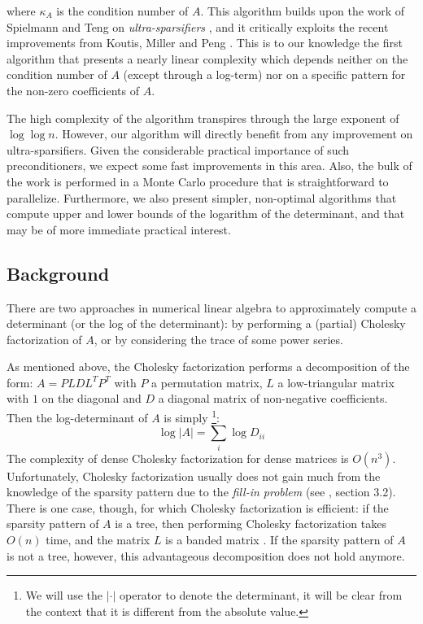 where $\kappa_{A}$ is the condition number of $A$. This algorithm
builds upon the work of Spielmann and Teng on \emph{ultra-sparsifiers}
\cite{Spielman2009a}, and it critically exploits the recent improvements
from Koutis, Miller and Peng \cite{Koutis2010}. This is to our knowledge
the first algorithm that presents a nearly linear complexity which
depends neither on the condition number of $A$ (except through a
log-term) nor on a specific pattern for the non-zero coefficients
of $A$.

The high complexity of the algorithm transpires through the large
exponent of $\log\log n$. However, our algorithm will directly benefit
from any improvement on ultra-sparsifiers. Given the considerable
practical importance of such preconditioners, we expect some fast
improvements in this area. Also, the bulk of the work is performed
in a Monte Carlo procedure that is straightforward to parallelize.
Furthermore, we also present simpler, non-optimal algorithms that
compute upper and lower bounds of the logarithm of the determinant,
and that may be of more immediate practical interest.

\subsection{Background} 
There are two approaches in numerical linear algebra
to approximately compute a determinant (or the log of the determinant):
by performing a (partial) Cholesky factorization of $A$, or by considering
the trace of some power series.

As mentioned above, the Cholesky factorization performs a decomposition
of the form: $A=PLDL^{T}P^{T}$ with $P$ a permutation matrix, $L$
a low-triangular matrix with $1$ on the diagonal and $D$ a diagonal
matrix of non-negative coefficients. Then the log-determinant of $A$
is simply%
\footnote{We will use the $\left|\cdot\right|$ operator to denote the determinant,
it will be clear from the context that it is different from the absolute
value.%
}: 
\[
\log\left|A\right|=\sum_{i}\log D_{ii}
\]
The complexity of dense Cholesky factorization for dense matrices
is $O\left(n^{3}\right)$. Unfortunately, Cholesky factorization usually
does not gain much from the knowledge of the sparsity pattern due
to the \emph{fill-in problem} (see \cite{meurant1999computer}, section
3.2). There is one case, though, for which Cholesky factorization
is efficient: if the sparsity pattern of $A$ is a tree, then performing
Cholesky factorization takes $O\left(n\right)$ time, and the matrix
$L$ is a banded matrix \cite{liu1990eliminationtrees}. If the sparsity
pattern of $A$ is not a tree, however, this advantageous decomposition
does not hold anymore.

